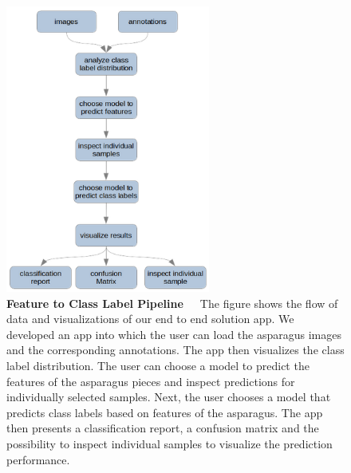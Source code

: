 \begin{figure}[!htb]
    \centering
    \includegraphics[width=0.60\textwidth]{Figures/chapter04/ftl_pipeline.png}
    \decoRule
    \caption[Feature to Class Label Pipeline]{\textbf{Feature to Class Label Pipeline}~~~The figure shows the flow of data and visualizations of our end to end solution app. We developed an app into which the user can load the asparagus images and the corresponding annotations. The app then visualizes the class label distribution. The user can choose a model to predict the features of the asparagus pieces and inspect predictions for individually selected samples. Next, the user chooses a model that predicts class labels based on features of the asparagus. The app then presents a classification report, a confusion matrix and the possibility to inspect individual samples to visualize the prediction performance.}
    \label{fig:FeatureEngineeringNetStructure}
\end{figure}

